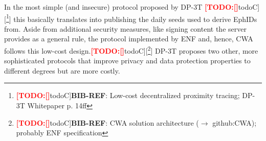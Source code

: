 \documentclass{llncs}
\newcommand{\TODO}[1]{\textcolor{red}{\textbf{[TODO:#1]}}}
\newcommand*{\TODOfn}[2][noteC]{\TODO[#1]{[\footnote{\TODO[#1]{#2}}]}}
\newcommand*{\TODOref}[2][todoC]{\TODOfn[#1]{\textbf{BIB-REF}: #2}}
\begin{document}
In the most simple (and insecure) protocol proposed by DP-3T
\TODOref{Low-cost decentralized proximity tracing; DP-3T Whitepaper p. 14ff}
this basically translates into publishing the daily seeds used to derive EphIDs from.
Aside from additional security measures,
like signing content the server provides as a general rule, the protocol implemented by ENF and,
hence, CWA follows this low-cost design.\TODOref{CWA solution architecture ($\rightarrow$ github:CWA); probably ENF specification} DP-3T proposes two other, more sophisticated protocols that improve
privacy and data protection properties to different degrees but are more costly.
\end{document}
